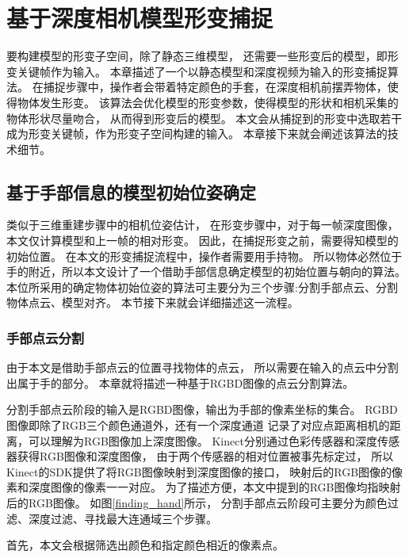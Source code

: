 \chapter{基于深度相机模型形变捕捉}
要构建模型的形变子空间，除了静态三维模型，
还需要一些形变后的模型，即形变关键帧作为输入。
本章描述了一个以静态模型和深度视频为输入的形变捕捉算法。
在捕捉步骤中，操作者会带着特定颜色的手套，在深度相机前摆弄物体，使得物体发生形变。
该算法会优化模型的形变参数，使得模型的形状和相机采集的物体形状尽量吻合，
从而得到形变后的模型。
本文会从捕捉到的形变中选取若干成为形变关键帧，作为形变子空间构建的输入。
本章接下来就会阐述该算法的技术细节。

\section{基于手部信息的模型初始位姿确定}

 类似于三维重建步骤中的相机位姿估计，
 在形变步骤中，对于每一帧深度图像，本文仅计算模型和上一帧的相对形变。
 因此，在捕捉形变之前，需要得知模型的初始位置。
 在本文的形变捕捉流程中，操作者需要用手持物。
 所以物体必然位于手的附近，所以本文设计了一个借助手部信息确定模型的初始位置与朝向的算法。
 本位所采用的确定物体初始位姿的算法可主要分为三个步骤:分割手部点云、分割物体点云、模型对齐。
 本节接下来就会详细描述这一流程。

\subsection{手部点云分割}
由于本文是借助手部点云的位置寻找物体的点云，
所以需要在输入的点云中分割出属于手的部分。
本章就将描述一种基于RGBD图像的点云分割算法。

分割手部点云阶段的输入是RGBD图像，输出为手部的像素坐标的集合。
RGBD图像即除了RGB三个颜色通道外，还有一个深度通道
记录了对应点距离相机的距离，可以理解为RGB图像加上深度图像。
Kinect分别通过色彩传感器和深度传感器获得RGB图像和深度图像，
由于两个传感器的相对位置被事先标定过，
所以Kinect的SDK提供了将RGB图像映射到深度图像的接口，
映射后的RGB图像的像素和深度图像的像素一一对应。
为了描述方便，本文中提到的RGB图像均指映射后的RGB图像。
如图\ref{finding_hand}所示，
分割手部点云阶段可主要分为颜色过滤、深度过滤、寻找最大连通域三个步骤。

首先，本文会根据筛选出颜色和指定颜色相近的像素点。

